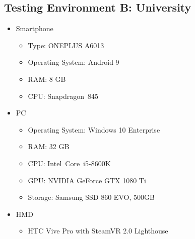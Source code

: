 \begin{appendices}
  \section{Testing Environment B: University}
  \begin{itemize}
    \item Smartphone
    \begin{itemize}
      \item Type: ONEPLUS A6013
      \item Operating System: Android 9
      \item RAM: 8 GB
      \item CPU: Snapdragon\texttrademark\ 845 %
    \end{itemize}
    \item \ac{PC}
    \begin{itemize}
      \item Operating System: Windows 10 Enterprise
      \item RAM: 32 GB
      \item CPU: Intel\textregistered\ Core\texttrademark\ i5-8600K %
      \item GPU: NVIDIA GeForce GTX 1080 Ti
      \item Storage: Samsung SSD 860 EVO, 500GB
    \end{itemize}
    \item \ac{HMD}
    \begin{itemize}
      \item HTC Vive Pro with SteamVR 2.0 Lighthouse
    \end{itemize}
  \end{itemize}

  
\end{appendices}